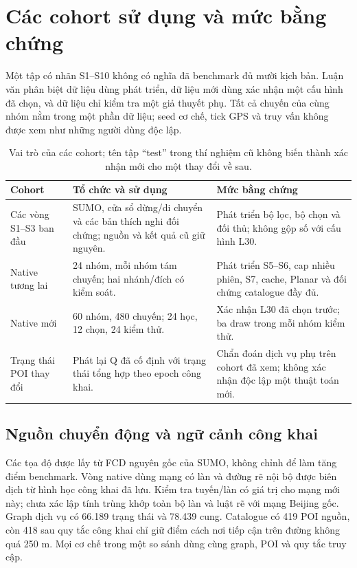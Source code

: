 \section{Các cohort sử dụng và mức bằng chứng}
\label{sec:current-dataset}

Một tập có nhãn S1--S10 không có nghĩa đã benchmark đủ mười kịch bản. Luận văn phân biệt dữ liệu dùng phát triển, dữ liệu mới dùng xác nhận một cấu hình đã chọn, và dữ liệu chỉ kiểm tra một giả thuyết phụ. Tất cả chuyến của cùng nhóm nằm trong một phần dữ liệu; seed cơ chế, tick GPS và truy vấn không được xem như những người dùng độc lập.

\begin{table}[htbp]
\centering\small
\caption{Vai trò của các cohort; tên tập ``test'' trong thí nghiệm cũ không biến thành xác nhận mới cho một thay đổi về sau.}
\label{tab:current-cohorts}
\begin{tabularx}{\textwidth}{P{3.1cm}Y Y}
\toprule
Cohort & Tổ chức và sử dụng & Mức bằng chứng\\
\midrule
Các vòng S1--S3 ban đầu & SUMO, cửa sổ dừng/di chuyển và các bản thích nghi đối chứng; nguồn và kết quả cũ giữ nguyên. & Phát triển bộ lọc, bộ chọn và đối thủ; không gộp số với cấu hình L30.\\
\addlinespace
Native tương lai & 24 nhóm, mỗi nhóm tám chuyến; hai nhánh/đích có kiểm soát. & Phát triển S5--S6, cap nhiều phiên, S7, cache, Planar và đối chứng catalogue đầy đủ.\\
\addlinespace
Native mới & 60 nhóm, 480 chuyến; 24 học, 12 chọn, 24 kiểm thử. & Xác nhận L30 đã chọn trước; ba draw trong mỗi nhóm kiểm thử.\\
\addlinespace
Trạng thái POI thay đổi & Phát lại Q đã cố định với trạng thái tổng hợp theo epoch công khai. & Chẩn đoán dịch vụ phụ trên cohort đã xem; không xác nhận độc lập một thuật toán mới.\\
\bottomrule
\end{tabularx}
\end{table}

\subsection{Nguồn chuyển động và ngữ cảnh công khai}

Các tọa độ được lấy từ FCD nguyên gốc của SUMO, không chỉnh để làm tăng điểm benchmark. Vòng native dùng mạng có làn và đường rẽ nội bộ được biên dịch từ hình học công khai đã lưu. Kiểm tra tuyến/làn có giá trị cho mạng mới này; chưa xác lập tính trùng khớp toàn bộ làn và luật rẽ với mạng Beijing gốc. Graph dịch vụ có 66.189 trạng thái và 78.439 cung. Catalogue có 419 POI nguồn, còn 418 sau quy tắc công khai chỉ giữ điểm cách nơi tiếp cận trên đường không quá 250 m. Mọi cơ chế trong một so sánh dùng cùng graph, POI và quy tắc truy cập.

